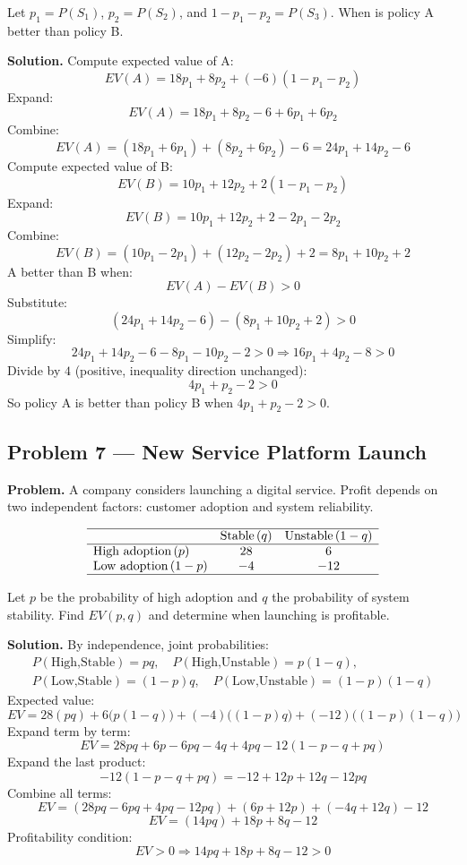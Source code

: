 \begin{ExamProblems}
		Let \(p_1=P(S_1)\), \(p_2=P(S_2)\), and \(1-p_1-p_2=P(S_3)\).  
		When is policy A better than policy B.
		
		\textbf{Solution.}
		Compute expected value of A:
		\[
		EV(A)=18p_1 + 8p_2 + (-6)(1-p_1-p_2)
		\]
		Expand:
		\[
		EV(A)=18p_1 + 8p_2 -6 + 6p_1 + 6p_2
		\]
		Combine:
		\[
		EV(A)=(18p_1+6p_1) + (8p_2+6p_2) - 6 = 24p_1 + 14p_2 - 6
		\]
		Compute expected value of B:
		\[
		EV(B)=10p_1 + 12p_2 + 2(1-p_1-p_2)
		\]
		Expand:
		\[
		EV(B)=10p_1 + 12p_2 + 2 - 2p_1 - 2p_2
		\]
		Combine:
		\[
		EV(B)=(10p_1-2p_1) + (12p_2-2p_2) + 2 = 8p_1 + 10p_2 + 2
		\]
		A better than B when:
		\[
		EV(A)-EV(B)>0
		\]
		Substitute:
		\[
		(24p_1+14p_2-6)-(8p_1+10p_2+2)>0
		\]
		Simplify:
		\[
		24p_1+14p_2-6-8p_1-10p_2-2>0
		\Rightarrow 16p_1+4p_2-8>0
		\]
		Divide by \(4\) (positive, inequality direction unchanged):
		\[
		4p_1+p_2-2>0
		\]
		So policy A is better than policy B when \(4p_1+p_2-2>0\).
		
		
		\hypertarget{c7-ex7}{}
		\item\leavevmode\par
		\subsection*{Problem 7 — New Service Platform Launch}
		
		\textbf{Problem.}
		A company considers launching a digital service. Profit depends on two independent factors:
		customer adoption and system reliability.
		
		\[
		\begin{array}{lcc}
			\hline
			& \text{Stable}\,(q) & \text{Unstable}\,(1-q) \\
			\hline
			\text{High adoption}\,(p) & 28 & 6 \\
			\text{Low adoption}\,(1-p) & -4 & -12 \\
			\hline
		\end{array}
		\]
		
		Let \(p\) be the probability of high adoption and \(q\) the probability of system stability.  
		Find \(EV(p,q)\) and determine when launching is profitable.
		
		\textbf{Solution.}
		By independence, joint probabilities:
		\[
		\begin{gathered}P(\text{High,Stable})=pq,\quad
		P(\text{High,Unstable})=p(1-q),\\
		P(\text{Low,Stable})=(1-p)q,\quad
		P(\text{Low,Unstable})=(1-p)(1-q)\end{gathered}
		\]
		Expected value:
		\[
		EV=28(pq)+6\bigl(p(1-q)\bigr)+(-4)\bigl((1-p)q\bigr)+(-12)\bigl((1-p)(1-q)\bigr)
		\]
		Expand term by term:
		\[
		EV=28pq + 6p - 6pq - 4q + 4pq - 12(1-p-q+pq)
		\]
		Expand the last product:
		\[
		-12(1-p-q+pq)=-12 + 12p + 12q - 12pq
		\]
		Combine all terms:
		\[
		EV=(28pq-6pq+4pq-12pq) + (6p+12p) + (-4q+12q) - 12
		\]
		\[
		EV=(14pq) + 18p + 8q - 12
		\]
		Profitability condition:
		\[
		EV>0 \Rightarrow 14pq+18p+8q-12>0
		\]
		

\end{ExamProblems}
